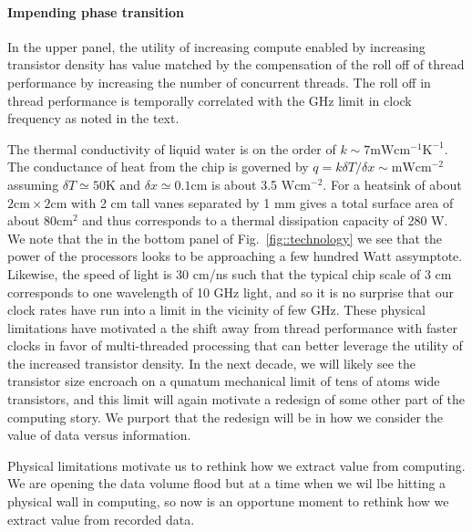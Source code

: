 \documentclass{article}
\begin{document}
\paragraph{Impending phase transition}
In the upper panel, the utility of increasing compute enabled by increasing transistor density has value matched by the compensation of the roll off of thread performance by increasing the number of concurrent threads.
The roll off in thread performance is temporally correlated with the GHz limit in clock frequency as noted in the text.

The thermal conductivity of liquid water is on the order of $k \sim 7 \mbox{mW} \mbox{cm}^{-1} \mbox{K}^{-1}$.
The conductance of heat from the chip is governed by $q = k \delta T / \delta x \sim \mbox{mW} \mbox{cm}^{-2}$ assuming $\delta T \simeq 50 \mbox{K}$ and $\delta x \simeq 0.1 \mbox{cm}$ is about 3.5 $\mbox{W} \mbox{cm}^{-2}$.
For a heatsink of about $2\mbox{cm}\times2\mbox{cm}$ with 2 cm tall vanes separated by 1 mm gives a total surface area of about $80 \mbox{cm}^{2}$ and thus corresponds to a thermal dissipation capacity of 280 W.
We note that the in the bottom panel of Fig.~\ref{fig::technology} we see that the power of the processors looks to be approaching a few hundred Watt assymptote.
Likewise, the speed of light is 30 cm/ns such that the typical chip scale of 3 cm corresponds to one wavelength of 10 GHz light, and so it is no surprise that our clock rates have run into a limit in the vicinity of few GHz.
These physical limitations have motivated a the shift away from thread performance with faster clocks in favor of multi-threaded processing that can better leverage the utility of the increased transistor density.
In the next decade, we will likely see the transistor size encroach on a qunatum mechanical limit of tens of atoms wide transistors, and this limit will again motivate a redesign of some other part of the computing story.
We purport that the redesign will be in how we consider the value of data versus information.

Physical limitations motivate us to rethink how we extract value from computing.  
We are opening the data volume flood but at a time when we wil lbe hitting a physical wall in computing, so now is an opportune moment to rethink how we extract value from recorded data.
\end{document}
